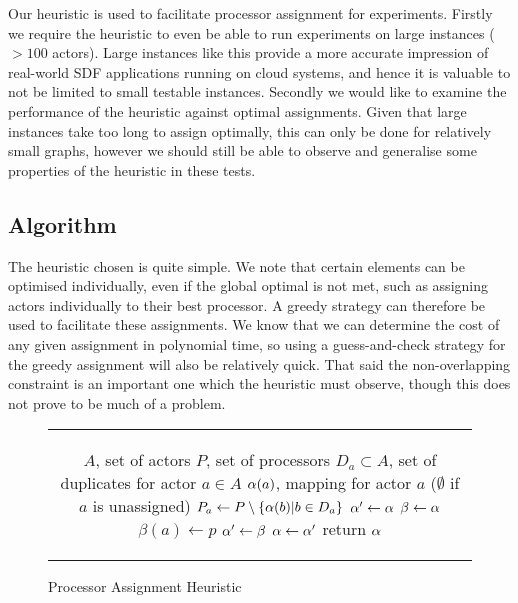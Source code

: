 Our heuristic is used to facilitate processor assignment for experiments.
Firstly we require the heuristic to even be able to run experiments on large instances ($> 100$ actors).
Large instances like this provide a more accurate impression of real-world SDF applications running on cloud systems, and hence it is valuable to not be limited to small testable instances.
Secondly we would like to examine the performance of the heuristic against optimal assignments.
Given that large instances take too long to assign optimally, this can only be done for relatively small graphs, however we should still be able to observe and generalise some properties of the heuristic in these tests.

\subsection{Algorithm}

The heuristic chosen is quite simple.
We note that certain elements can be optimised individually, even if the global optimal is not met, such as assigning actors individually to their best processor.
A greedy strategy can therefore be used to facilitate these assignments.
We know that we can determine the cost of any given assignment in polynomial time, so using a guess-and-check strategy for the greedy assignment will also be relatively quick.
That said the non-overlapping constraint is an important one which the heuristic must observe, though this does not prove to be much of a problem.

\begin{figure}
\begin{center}
	\begin{tabular}{|c|}
	\begin{minipage}{0.8\linewidth}
	\begin{algorithmic}
		\STATE $A$, set of actors
		\STATE $P$, set of processors
		\STATE $D_a \subset A$, set of duplicates for actor $a \in A$
		\STATE $\alpha(a)$, mapping for actor $a$ ($\emptyset$ if $a$ is unassigned)
		\FORALL{$a \in A$}
			\STATE $P_a \leftarrow P \setminus \{\alpha(b) | b \in D_a\}$
			\STATE $\alpha' \leftarrow \alpha$
			\FORALL{$p \in P_a$}
				\STATE $\beta \leftarrow \alpha$
				\STATE $\beta(a) \leftarrow p$
				\IF{$\rSolution' = \rSolution$ or $\rCost(\rSolution') > \rCost(\beta)$}
					\STATE $\alpha' \leftarrow \beta$
				\ENDIF
			\ENDFOR
			\STATE $\alpha \leftarrow \alpha'$
		\ENDFOR
		\STATE return $\alpha$
	\end{algorithmic}
	\end{minipage}
	\end{tabular}
\caption{Processor Assignment Heuristic}
\label{figAlgAlg}
\end{center}
\end{figure}

